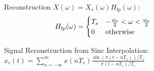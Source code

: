 \documentclass[12pt,landscape]{article}
\newcommand{\tab}{\hspace{0.02\textwidth}}
\newcommand{\ds}{\displaystyle}
\begin{document}
\begin{multicols*}{3}
Reconstruction $X(\omega)=X_s(\omega)H_\text{lp}(\omega)$:
\vspace{-1em}
\begin{equation*}
\hspace{-8em}
H_{\text{lp}}(\omega) =
\begin{cases}
T_s & -\frac{\omega_s}{2} < \omega < \frac{\omega_s}{2}\\
0 & \text{otherwise}
\end{cases}
\end{equation*}

Signal Reconstruction from Sinc Interpolation:\\
\tab $\ds x_r(t) = \sum_{n=-\infty}^{\infty} x(nT_s) \frac{\sin(\pi(t-nT_s))/T_s}{\pi(t-nT_s)/T_s}$
\end{multicols*}

\newpage
\end{document}
